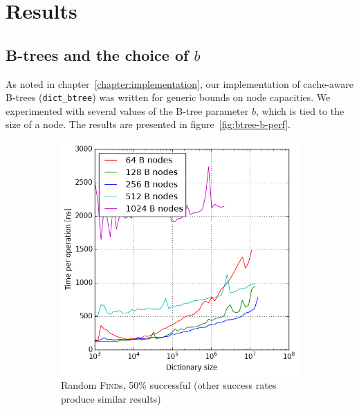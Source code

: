 \chapter{Results}
\label{chapter:results}

\section{\mbox{B-trees} and the choice of $b$}
\label{sec:btree-b-choice}
As noted in chapter~\ref{chapter:implementation}, our implementation of
cache-aware B-trees (\texttt{dict\_btree}) was written for generic bounds
on node capacities. We experimented with several values of the B-tree parameter
$b$, which is tied to the size of a node. The results are presented in
figure~\ref{fig:btree-b-perf}.

\begin{figure}
\centering
\begin{subfigure}[t]{0.45\textwidth}
	\includegraphics[width=\textwidth]{img/btree-b-find-50}
	\caption{Random \textsc{Find}s, 50\% successful (other success rates
		produce similar results)}
\end{subfigure}
~
\begin{subfigure}[t]{0.45\textwidth}

\end{subfigure}
\end{figure}

